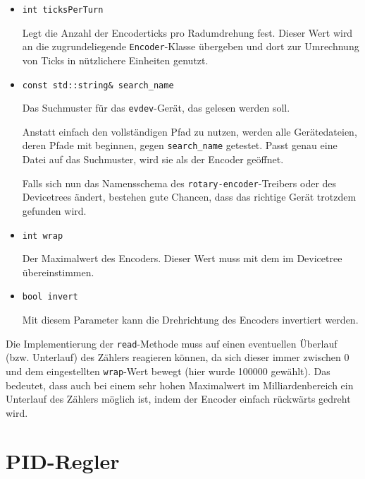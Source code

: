 \documentclass[german]{thesis_KBS}
\newcommand{\code}[1]{\texttt{#1}}  %
\begin{document}
\begin{itemize}
    \item \code{int ticksPerTurn}

    Legt die Anzahl der Encoderticks pro Radumdrehung fest. Dieser Wert wird an
    die zugrundeliegende \code{Encoder}-Klasse übergeben und dort zur Umrechnung
    von Ticks in nützlichere Einheiten genutzt.

    \item \code{const std::string\& search\_name}

    Das Suchmuster für das \code{evdev}-Gerät, das gelesen werden soll.

    Anstatt einfach den vollständigen Pfad zu nutzen, werden alle Gerätedateien,
    deren Pfade mit  beginnen, gegen \code{search\_name}
    getestet. Passt genau eine Datei auf das Suchmuster, wird sie als der
    Encoder geöffnet.

    Falls sich nun das Namensschema des \code{rotary-encoder}-Treibers oder des
    Devicetrees ändert, bestehen gute Chancen, dass das richtige Gerät trotzdem
    gefunden wird.

    \item \code{int wrap}

    Der Maximalwert des Encoders. Dieser Wert muss mit dem im Devicetree
    übereinstimmen.


    \item \code{bool invert}

    Mit diesem Parameter kann die Drehrichtung des Encoders invertiert werden.
\end{itemize}


Die Implementierung der \code{read}-Methode muss auf einen eventuellen Überlauf
(bzw. Unterlauf) des Zählers reagieren können, da sich dieser immer zwischen 0
und dem eingestellten \code{wrap}-Wert bewegt (hier wurde 100000 gewählt). Das
bedeutet, dass auch bei einem sehr hohen Maximalwert im Milliardenbereich ein
Unterlauf des Zählers möglich ist, indem der Encoder einfach rückwärts gedreht
wird.



\section{PID-Regler}
\end{document}
